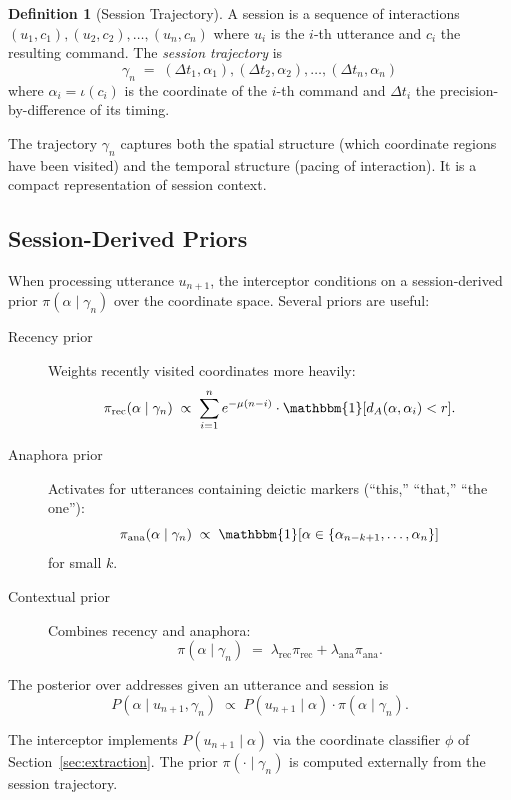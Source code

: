 \documentclass[11pt,twocolumn,a4paper]{article}
\theoremstyle{definition}
\newtheorem{definition}[theorem]{Definition}
\theoremstyle{remark}
\begin{document}
\begin{definition}[Session Trajectory]
\label{def:trajectory}
A session is a sequence of interactions $(u_1, c_1), (u_2, c_2), \ldots, (u_n, c_n)$ where $u_i$ is the $i$-th utterance and $c_i$ the resulting command. The \emph{session trajectory} is
\[
\gamma_n \;=\; (\Delta t_1, \alpha_1), (\Delta t_2, \alpha_2), \ldots, (\Delta t_n, \alpha_n)
\]
where $\alpha_i = \iota(c_i)$ is the coordinate of the $i$-th command and $\Delta t_i$ the precision-by-difference of its timing.
\end{definition}

The trajectory $\gamma_n$ captures both the spatial structure (which coordinate regions have been visited) and the temporal structure (pacing of interaction). It is a compact representation of session context.

\subsection{Session-Derived Priors}

When processing utterance $u_{n+1}$, the interceptor conditions on a session-derived prior $\pi(\alpha \mid \gamma_n)$ over the coordinate space. Several priors are useful:

\begin{description}
    \item[Recency prior] Weights recently visited coordinates more heavily:
    \[
    \pi_{\mathrm{rec}}(\alpha \mid \gamma_n) \;\propto\; \sum_{i=1}^{n} e^{-\mu(n-i)} \cdot \mathbbm{1}[d_A(\alpha, \alpha_i) < r].
    \]

    \item[Anaphora prior] Activates for utterances containing deictic markers (``this,'' ``that,'' ``the one''):
    \[
    \pi_{\mathrm{ana}}(\alpha \mid \gamma_n) \;\propto\; \mathbbm{1}[\alpha \in \{\alpha_{n-k+1}, \ldots, \alpha_n\}]
    \]
    for small $k$.

    \item[Contextual prior] Combines recency and anaphora:
    \[
    \pi(\alpha \mid \gamma_n) \;=\; \lambda_{\mathrm{rec}} \pi_{\mathrm{rec}} + \lambda_{\mathrm{ana}} \pi_{\mathrm{ana}}.
    \]
\end{description}

The posterior over addresses given an utterance and session is
\[
P(\alpha \mid u_{n+1}, \gamma_n) \;\propto\; P(u_{n+1} \mid \alpha) \cdot \pi(\alpha \mid \gamma_n).
\]

The interceptor implements $P(u_{n+1} \mid \alpha)$ via the coordinate classifier $\phi$ of Section~\ref{sec:extraction}. The prior $\pi(\cdot \mid \gamma_n)$ is computed externally from the session trajectory.
\end{document}
